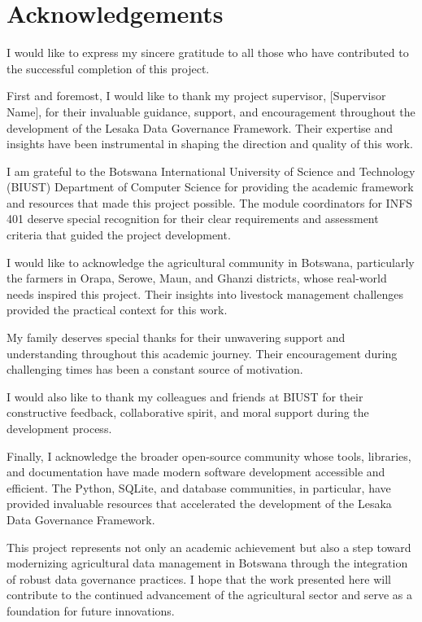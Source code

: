 
\chapter*{Acknowledgements}

I would like to express my sincere gratitude to all those who have contributed to the successful completion of this project.

First and foremost, I would like to thank my project supervisor, [Supervisor Name], for their invaluable guidance, support, and encouragement throughout the development of the Lesaka Data Governance Framework. Their expertise and insights have been instrumental in shaping the direction and quality of this work.

I am grateful to the Botswana International University of Science and Technology (BIUST) Department of Computer Science for providing the academic framework and resources that made this project possible. The module coordinators for INFS 401 deserve special recognition for their clear requirements and assessment criteria that guided the project development.

I would like to acknowledge the agricultural community in Botswana, particularly the farmers in Orapa, Serowe, Maun, and Ghanzi districts, whose real-world needs inspired this project. Their insights into livestock management challenges provided the practical context for this work.

My family deserves special thanks for their unwavering support and understanding throughout this academic journey. Their encouragement during challenging times has been a constant source of motivation.

I would also like to thank my colleagues and friends at BIUST for their constructive feedback, collaborative spirit, and moral support during the development process.

Finally, I acknowledge the broader open-source community whose tools, libraries, and documentation have made modern software development accessible and efficient. The Python, SQLite, and database communities, in particular, have provided invaluable resources that accelerated the development of the Lesaka Data Governance Framework.

This project represents not only an academic achievement but also a step toward modernizing agricultural data management in Botswana through the integration of robust data governance practices. I hope that the work presented here will contribute to the continued advancement of the agricultural sector and serve as a foundation for future innovations.

